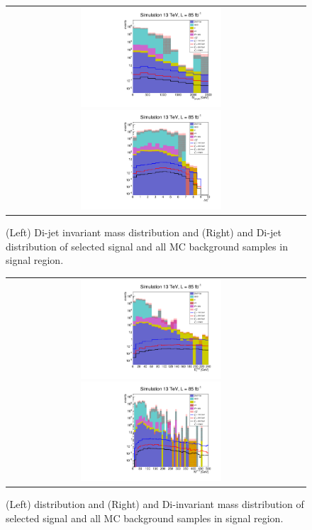 \begin{figure}[tbh!]
	\centering
	\begin{tabular}{cc}
		\includegraphics[width=0.5\textwidth]{analysis/pics/h_dijetinvariantmass_Taui2TightIso.pdf}
		\includegraphics[width=0.5\textwidth]{analysis/pics/h_dijetdeltaeta_Taui2TightIso.pdf} 		
	\end{tabular}
	\caption{(Left) Di-jet invariant mass distribution and (Right) and Di-jet \deltaeta distribution of selected signal and all MC background samples in signal region.}
	\label{fig::crplots1_Taui2TightIso_13tev_results}
\end{figure}

\begin{figure}[tbh!]
	\centering
	\begin{tabular}{cc}
		\includegraphics[width=0.5\textwidth]{analysis/pics/h_met_Taui2TightIso.pdf}
		\includegraphics[width=0.5\textwidth]{analysis/pics/h_ditauinvariantmass_Taui2TightIso.pdf} 		
	\end{tabular}
	\caption{(Left) \met distribution and (Right) and Di-\hadtau invariant mass distribution of selected signal and all MC background samples in signal region.}
	\label{fig::crplots2_Taui2TightIso_13tev_results}
\end{figure}


